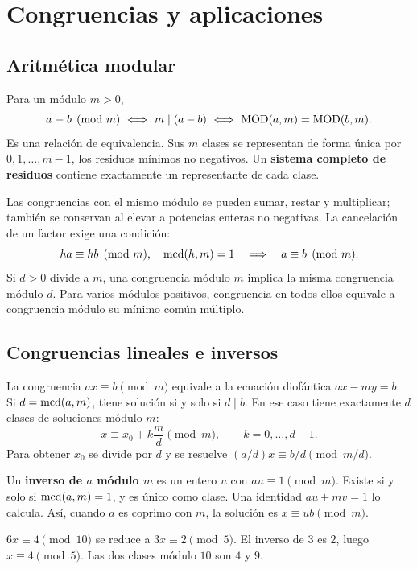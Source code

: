 \chapter{Congruencias y aplicaciones}
\label{md:congruencias}

\section{Aritmética modular}
\label{md:aritmetica-modular}

Para un módulo $m>0$,
\[
 a\equiv b\pmod m\ \Longleftrightarrow\ m\mid(a-b)
 \ \Longleftrightarrow\ \operatorname{MOD}(a,m)=\operatorname{MOD}(b,m).
\]
Es una relación de equivalencia. Sus $m$ clases se representan de
forma única por $0,1,\ldots,m-1$, los residuos mínimos no negativos.
Un \textbf{sistema completo de residuos} contiene exactamente un
representante de cada clase.

Las congruencias con el mismo módulo se pueden sumar, restar y multiplicar;
también se conservan al elevar a potencias enteras no negativas.
La cancelación de un factor exige una condición:
\[
 ha\equiv hb\pmod m,\quad\operatorname{mcd}(h,m)=1
 \quad\Longrightarrow\quad a\equiv b\pmod m.
\]
Si $d>0$ divide a $m$, una congruencia módulo $m$ implica la misma
congruencia módulo $d$. Para varios módulos positivos,
congruencia en todos ellos equivale a congruencia módulo su mínimo
común múltiplo.

\section{Congruencias lineales e inversos}
\label{md:congruencia-lineal}

La congruencia $ax\equiv b\pmod m$ equivale a la ecuación
diofántica $ax-my=b$. Si $d=\operatorname{mcd}(a,m)$, tiene solución
si y solo si $d\mid b$. En ese caso tiene exactamente $d$ clases
de soluciones módulo $m$:
\[
 x\equiv x_0+k\frac md\pmod m,\qquad k=0,\ldots,d-1.
\]
Para obtener $x_0$ se divide por $d$ y se resuelve
$(a/d)x\equiv b/d\pmod{m/d}$.

Un \textbf{inverso de $a$ módulo $m$} es un entero $u$ con
$au\equiv1\pmod m$. Existe si y solo si $\operatorname{mcd}(a,m)=1$,
y es único como clase. Una identidad $au+mv=1$ lo calcula.
Así, cuando $a$ es coprimo con $m$, la solución es $x\equiv ub\pmod m$.

\begin{ejemplo}
$6x\equiv4\pmod{10}$ se reduce a $3x\equiv2\pmod5$.
El inverso de $3$ es $2$, luego $x\equiv4\pmod5$.
Las dos clases módulo $10$ son $4$ y $9$.
\end{ejemplo}

